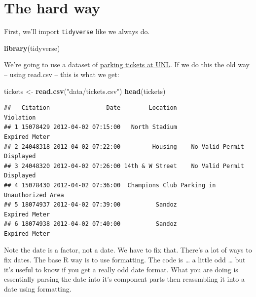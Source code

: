 \documentclass[]{book}
\newenvironment{Shaded}{\begin{snugshade}}{\end{snugshade}}
\newcommand{\DataTypeTok}[1]{\textcolor[rgb]{0.13,0.29,0.53}{#1}}
\newcommand{\KeywordTok}[1]{\textcolor[rgb]{0.13,0.29,0.53}{\textbf{#1}}}
\newcommand{\NormalTok}[1]{#1}
\newcommand{\OperatorTok}[1]{\textcolor[rgb]{0.81,0.36,0.00}{\textbf{#1}}}
\newcommand{\StringTok}[1]{\textcolor[rgb]{0.31,0.60,0.02}{#1}}
\begin{document}
\hypertarget{the-hard-way}{%
\section{The hard way}\label{the-hard-way}}

First, we'll import \texttt{tidyverse} like we always do.

\begin{Shaded}
\begin{Highlighting}[]
\KeywordTok{library}\NormalTok{(tidyverse)}
\end{Highlighting}
\end{Shaded}

We're going to use a dataset of \href{https://unl.box.com/s/3c5kx2i5iouc52ty46k4js412u48yajr}{parking tickets at UNL}. If we do this the old way -- using read.csv -- this is what we get:

\begin{Shaded}
\begin{Highlighting}[]
\NormalTok{tickets <-}\StringTok{ }\KeywordTok{read.csv}\NormalTok{(}\StringTok{"data/tickets.csv"}\NormalTok{)}
\KeywordTok{head}\NormalTok{(tickets)}
\end{Highlighting}
\end{Shaded}

\begin{verbatim}
##   Citation                Date        Location                    Violation
## 1 15078429 2012-04-02 07:15:00   North Stadium                Expired Meter
## 2 24048318 2012-04-02 07:22:00         Housing    No Valid Permit Displayed
## 3 24048320 2012-04-02 07:26:00 14th & W Street    No Valid Permit Displayed
## 4 15078430 2012-04-02 07:36:00  Champions Club Parking in Unauthorized Area
## 5 18074937 2012-04-02 07:39:00          Sandoz                Expired Meter
## 6 18074938 2012-04-02 07:40:00          Sandoz                Expired Meter
\end{verbatim}

Note the date is a factor, not a date. We have to fix that. There's a lot of ways to fix dates. The base R way is to use formatting. The code is \ldots{} a little odd \ldots{} but it's useful to know if you get a really odd date format. What you are doing is essentially parsing the date into it's component parts then reassmbling it into a date using formatting.

\begin{Shaded}
\end{Shaded}
\end{document}
